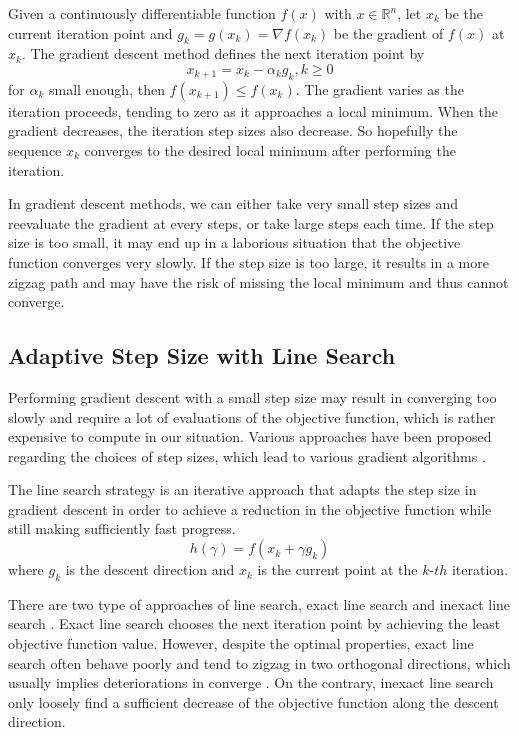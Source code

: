 Given a continuously differentiable function $ f(x) $ with $ x \in \mathbb{R}^{n} $, let $ x_{k} $ be the current iteration point and $ g_{k}=g(x_{k})= \nabla f(x_{k}) $ be the gradient of $ f(x) $ at $ x_{k} $. The gradient descent method defines the next iteration point by
\[ x_{k+1}=x_{k}- \alpha_{k} g_{k} , k \geq 0 \]
for $ \alpha_{k} $ small enough, then $ f(x_{k+1}) \leq f(x_{k}) $. The gradient varies as the iteration proceeds, tending to zero as it approaches a local minimum. When the gradient decreases, the iteration step sizes also decrease. So hopefully the sequence $ {x_{k}} $ converges to the desired local minimum after performing the iteration.

In gradient descent methods, we can either take very small step sizes and reevaluate the gradient at every steps, or take large steps each time. If the step size is too small, it may end up in a laborious situation that the objective function converges very slowly. If the step size is too large, it results in a more zigzag path and may have the risk of missing the local minimum and thus cannot converge.

\subsection{Adaptive Step Size with Line Search}
Performing gradient descent with a small step size may result in converging too slowly and require a lot of evaluations of the objective function, which is rather expensive to compute in our situation. Various approaches have been proposed regarding the choices of step sizes, which lead to various gradient algorithms \cite{yuan_step-sizes_2008}.

The line search strategy is an iterative approach that adapts the step size in gradient descent in order to achieve a reduction in the objective function while still making sufficiently fast progress.
\[ h( \gamma)=f(x_{k}+\gamma g_{k}) \]
where $ g_{k} $ is the descent direction and $ x_{k} $ is the current point at the $ k$-$th $ iteration.

There are two type of approaches of line search, exact line search and inexact line search \cite{vrahatis_class_2000}.
Exact line search chooses the next iteration point by achieving the least objective function value. However, despite the optimal properties, exact line search often behave poorly and tend to zigzag in two orthogonal directions, which usually implies deteriorations in converge \cite{zhou_gradient_2006}.
On the contrary, inexact line search only loosely find a sufficient decrease of the objective function along the descent direction.

